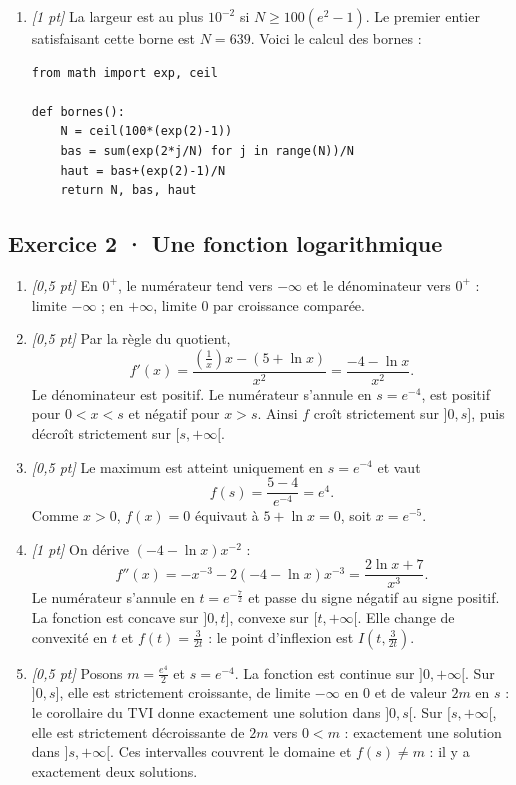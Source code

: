 \begin{enumerate}

\item \textit{[1 pt]} La largeur est au plus $10^{-2}$ si $N\ge100(e^{2}-1)$. Le premier entier satisfaisant cette borne est $N=639$. Voici le calcul des bornes :
\begin{lstlisting}
from math import exp, ceil

def bornes():
    N = ceil(100*(exp(2)-1))
    bas = sum(exp(2*j/N) for j in range(N))/N
    haut = bas+(exp(2)-1)/N
    return N, bas, haut
\end{lstlisting}


\end{enumerate}

\subsection*{Exercice 2 · Une fonction logarithmique}\begin{enumerate}

\item \textit{[0,5 pt]} En $0^+$, le numérateur tend vers $-\infty$ et le dénominateur vers $0^+$ : limite $-\infty$ ; en $+\infty$, limite $0$ par croissance comparée.

\item \textit{[0,5 pt]} Par la règle du quotient,
\[f'(x)=\frac{(\frac{1}{x})x-(5+\ln x)}{x^2}=\frac{-4-\ln x}{x^2}.\]
Le dénominateur est positif. Le numérateur s'annule en $s=e^{-4}$, est positif pour $0<x<s$ et négatif pour $x>s$. Ainsi $f$ croît strictement sur $]0,s]$, puis décroît strictement sur $[s,+\infty[$.

\item \textit{[0,5 pt]} Le maximum est atteint uniquement en $s=e^{-4}$ et vaut
\[f(s)=\frac{5- 4}{e^{-4}}=e^{4}.\]
Comme $x>0$, $f(x)=0$ équivaut à $5+\ln x=0$, soit $x=e^{-5}$.

\item \textit{[1 pt]} On dérive $(-4-\ln x)x^{-2}$ :
\[f''(x)=-x^{-3}-2(-4-\ln x)x^{-3}=\frac{2\ln x+7}{x^3}.\]
Le numérateur s'annule en $t=e^{-\frac{7}{2}}$ et passe du signe négatif au signe positif. La fonction est concave sur $]0,t]$, convexe sur $[t,+\infty[$. Elle change de convexité en $t$ et $f(t)=\frac{3}{2t}$ : le point d'inflexion est $I(t,\frac{3}{2t})$.

\item \textit{[0,5 pt]} Posons $m=\frac{e^{4}}{2}$ et $s=e^{-4}$. La fonction est continue sur $]0,+\infty[$. Sur $]0,s]$, elle est strictement croissante, de limite $-\infty$ en $0$ et de valeur $2m$ en $s$ : le corollaire du TVI donne exactement une solution dans $]0,s[$. Sur $[s,+\infty[$, elle est strictement décroissante de $2m$ vers $0<m$ : exactement une solution dans $]s,+\infty[$. Ces intervalles couvrent le domaine et $f(s)\ne m$ : il y a exactement deux solutions.


\end{enumerate}
